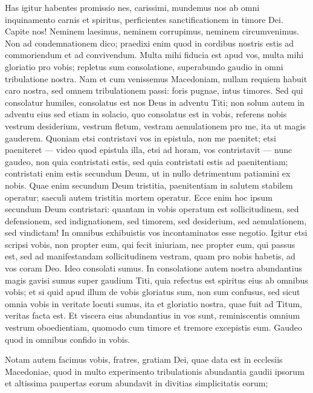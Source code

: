 \begin{biblechapter}
\begin{biblechapter}
\begin{biblechapter}
\begin{biblechapter}
\begin{biblechapter}
\begin{biblechapter}
\begin{biblechapter}
\verse Has igitur habentes promissio nes, carissimi, mundemus nos ab omni inquinamento carnis et spiritus, perficientes sanctificationem in timore Dei.
 \verse Capite nos! Neminem laesimus, neminem corrupimus, neminem circumvenimus. 
\verse Non ad condemnationem dico; praedixi enim quod in cordibus nostris estis ad commoriendum et ad convivendum. 
\verse Multa mihi fiducia est apud vos, multa mihi gloriatio pro vobis; repletus sum consolatione, superabundo gaudio in omni tribulatione nostra. 
\verse Nam et cum venissemus Macedoniam, nullam requiem habuit caro nostra, sed omnem tribulationem passi: foris pugnae, intus timores.
 \verse Sed qui consolatur humiles, consolatus est nos Deus in adventu Titi; 
\verse non solum autem in adventu eius sed etiam in solacio, quo consolatus est in vobis, referens nobis vestrum desiderium, vestrum fletum, vestram aemulationem pro me, ita ut magis gauderem.
 \verse Quoniam etsi contristavi vos in epistula, non me paenitet; etsi paeniteret — video quod epistula illa, etsi ad horam, vos contristavit — 
\verse nunc gaudeo, non quia contristati estis, sed quia contristati estis ad paenitentiam; contristati enim estis secundum Deum, ut in nullo detrimentum patiamini ex nobis. 
\verse Quae enim secundum Deum tristitia, paenitentiam in salutem stabilem operatur; saeculi autem tristitia mortem operatur. 
\verse Ecce enim hoc ipsum secundum Deum contristari: quantam in vobis operatum est sollicitudinem, sed defensionem, sed indignationem, sed timorem, sed desiderium, sed aemulationem, sed vindictam! In omnibus exhibuistis vos incontaminatos esse negotio. 
\verse Igitur etsi scripsi vobis, non propter eum, qui fecit iniuriam, nec propter eum, qui passus est, sed ad manifestandam sollicitudinem vestram, quam pro nobis habetis, ad vos coram Deo. 
\verse Ideo consolati sumus.
 In consolatione autem nostra abundantius magis gavisi sumus super gaudium Titi, quia refectus est spiritus eius ab omnibus vobis; 
\verse et si quid apud illum de vobis gloriatus sum, non sum confusus, sed sicut omnia vobis in veritate locuti sumus, ita et gloriatio nostra, quae fuit ad Titum, veritas facta est. 
 \verse Et viscera eius abundantius in vos sunt, reminiscentis omnium vestrum oboedientiam, quomodo cum timore et tremore excepistis eum. 
\verse Gaudeo quod in omnibus confido in vobis.  
\begin{biblechapter}
\verse Notam autem facimus vobis, fratres, gratiam Dei, quae data est in ecclesiis Macedoniae, 
\verse quod in multo experimento tribulationis abundantia gaudii ipsorum et altissima paupertas eorum abundavit in divitias simplicitatis eorum; 

\end{biblechapter}
\end{biblechapter}
\end{biblechapter}
\end{biblechapter}
\end{biblechapter}
\end{biblechapter}
\end{biblechapter}
\end{biblechapter}
